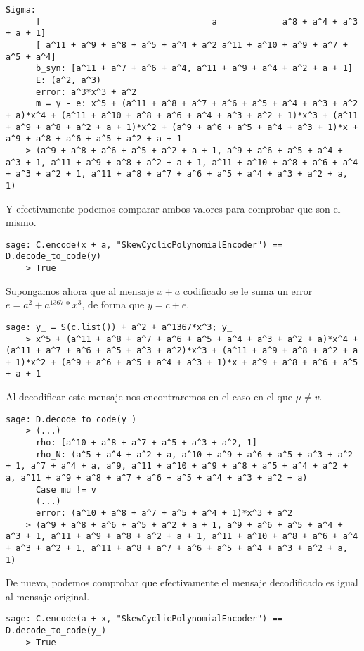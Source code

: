 \begin{example}
\begin{lstlisting}[gobble=4, basicstyle=\small\ttfamily]
      Sigma:
      [                                  a             a^8 + a^4 + a^3 + a + 1]
      [ a^11 + a^9 + a^8 + a^5 + a^4 + a^2 a^11 + a^10 + a^9 + a^7 + a^5 + a^4]
      b_syn: [a^11 + a^7 + a^6 + a^4, a^11 + a^9 + a^4 + a^2 + a + 1]
      E: (a^2, a^3)
      error: a^3*x^3 + a^2
      m = y - e: x^5 + (a^11 + a^8 + a^7 + a^6 + a^5 + a^4 + a^3 + a^2 + a)*x^4 + (a^11 + a^10 + a^8 + a^6 + a^4 + a^3 + a^2 + 1)*x^3 + (a^11 + a^9 + a^8 + a^2 + a + 1)*x^2 + (a^9 + a^6 + a^5 + a^4 + a^3 + 1)*x + a^9 + a^8 + a^6 + a^5 + a^2 + a + 1
    > (a^9 + a^8 + a^6 + a^5 + a^2 + a + 1, a^9 + a^6 + a^5 + a^4 + a^3 + 1, a^11 + a^9 + a^8 + a^2 + a + 1, a^11 + a^10 + a^8 + a^6 + a^4 + a^3 + a^2 + 1, a^11 + a^8 + a^7 + a^6 + a^5 + a^4 + a^3 + a^2 + a, 1)
  \end{lstlisting}
  Y efectivamente podemos comparar ambos valores para comprobar que son el mismo.
  \begin{lstlisting}[gobble=4]
    sage: C.encode(x + a, "SkewCyclicPolynomialEncoder") == D.decode_to_code(y)
    > True
  \end{lstlisting}

  Supongamos ahora que al mensaje \(x + a\) codificado se le suma un error \(e = a^2 + a^{1367}*x^3\), de forma que \(y = c + e\).

  \begin{lstlisting}[gobble=4]
    sage: y_ = S(c.list()) + a^2 + a^1367*x^3; y_
    > x^5 + (a^11 + a^8 + a^7 + a^6 + a^5 + a^4 + a^3 + a^2 + a)*x^4 + (a^11 + a^7 + a^6 + a^5 + a^3 + a^2)*x^3 + (a^11 + a^9 + a^8 + a^2 + a + 1)*x^2 + (a^9 + a^6 + a^5 + a^4 + a^3 + 1)*x + a^9 + a^8 + a^6 + a^5 + a + 1
  \end{lstlisting}

  Al decodificar este mensaje nos encontraremos en el caso en el que \(\mu \neq v\).

  \begin{lstlisting}[gobble=4, basicstyle=\small\ttfamily]
    sage: D.decode_to_code(y_)
    > (...)
      rho: [a^10 + a^8 + a^7 + a^5 + a^3 + a^2, 1]
      rho_N: (a^5 + a^4 + a^2 + a, a^10 + a^9 + a^6 + a^5 + a^3 + a^2 + 1, a^7 + a^4 + a, a^9, a^11 + a^10 + a^9 + a^8 + a^5 + a^4 + a^2 + a, a^11 + a^9 + a^8 + a^7 + a^6 + a^5 + a^4 + a^3 + a^2 + a)
      Case mu != v
      (...)
      error: (a^10 + a^8 + a^7 + a^5 + a^4 + 1)*x^3 + a^2
    > (a^9 + a^8 + a^6 + a^5 + a^2 + a + 1, a^9 + a^6 + a^5 + a^4 + a^3 + 1, a^11 + a^9 + a^8 + a^2 + a + 1, a^11 + a^10 + a^8 + a^6 + a^4 + a^3 + a^2 + 1, a^11 + a^8 + a^7 + a^6 + a^5 + a^4 + a^3 + a^2 + a, 1)
  \end{lstlisting}

  De nuevo, podemos comprobar que efectivamente el mensaje decodificado es igual al mensaje original.

  \begin{lstlisting}[gobble=4]
    sage: C.encode(a + x, "SkewCyclicPolynomialEncoder") == D.decode_to_code(y_)
    > True
  \end{lstlisting}

\end{example}